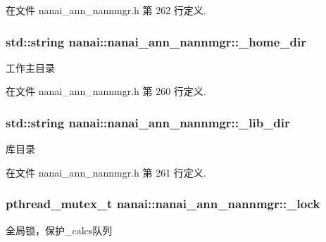 在文件 nanai\+\_\+ann\+\_\+nannmgr.\+h 第 262 行定义.

\hypertarget{classnanai_1_1nanai__ann__nannmgr_a8305b13f05cfd2ec029dc325f0921609}{}
\subsubsection[{\+\_\+home\+\_\+dir}]{\setlength{\rightskip}{0pt plus 5cm}std\+::string nanai\+::nanai\+\_\+ann\+\_\+nannmgr\+::\+\_\+home\+\_\+dir\hspace{0.3cm}{\ttfamily [protected]}}\label{classnanai_1_1nanai__ann__nannmgr_a8305b13f05cfd2ec029dc325f0921609}
工作主目录 

在文件 nanai\+\_\+ann\+\_\+nannmgr.\+h 第 260 行定义.

\hypertarget{classnanai_1_1nanai__ann__nannmgr_ac074b69306e1ff1a381fbcde3d66d75c}{}
\subsubsection[{\+\_\+lib\+\_\+dir}]{\setlength{\rightskip}{0pt plus 5cm}std\+::string nanai\+::nanai\+\_\+ann\+\_\+nannmgr\+::\+\_\+lib\+\_\+dir\hspace{0.3cm}{\ttfamily [protected]}}\label{classnanai_1_1nanai__ann__nannmgr_ac074b69306e1ff1a381fbcde3d66d75c}
库目录 

在文件 nanai\+\_\+ann\+\_\+nannmgr.\+h 第 261 行定义.

\hypertarget{classnanai_1_1nanai__ann__nannmgr_a9c4963abd61f8aa52b372c01062b5b4d}{}
\subsubsection[{\+\_\+lock}]{\setlength{\rightskip}{0pt plus 5cm}pthread\+\_\+mutex\+\_\+t nanai\+::nanai\+\_\+ann\+\_\+nannmgr\+::\+\_\+lock\hspace{0.3cm}{\ttfamily [protected]}}\label{classnanai_1_1nanai__ann__nannmgr_a9c4963abd61f8aa52b372c01062b5b4d}
全局锁，保护\+\_\+calcs队列 

